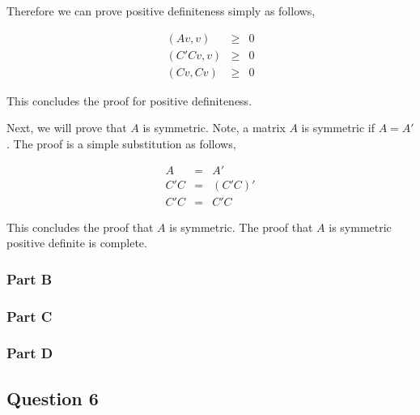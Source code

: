 Therefore we can prove positive definiteness simply as follows,

\begin{eqnarray}
  (Av,v) &\ge& 0 \\
  (C'Cv,v) &\ge& 0 \\
  (Cv,Cv) &\ge& 0
\end{eqnarray}

This concludes the proof for positive definiteness.

Next, we will prove that \(A\) is symmetric.
Note, a matrix \(A\) is symmetric if \(A = A'\).
The proof is a simple substitution as follows,

\begin{eqnarray}
  A &=& A' \\
  C'C &=& (C'C)' \\
  C'C &=& C'C
\end{eqnarray}

This concludes the proof that \(A\) is symmetric.
The proof that \(A\) is symmetric positive definite is complete.

\subsubsection{Part B}
\subsubsection{Part C}
\subsubsection{Part D}

\newpage
\subsection{Question 6}

%
